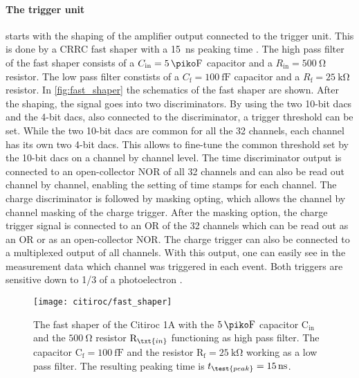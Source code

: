 \paragraph{The trigger unit} starts with the shaping of the amplifier output connected to the trigger unit. 
This is done by a CRRC fast shaper with a \SI{15}{\nano\second} peaking time \cite{citiroc}. 
The high pass filter of the fast shaper consists of a $C_\text{in}=\SI{5}{\piko\farad}$ capacitor and a $R_\text{in}=\SI{500}{\ohm}$ resistor.
The low pass filter constists of a $C_\text{f}=\SI{100}{\femto\farad}$ capacitor and a $R_\text{f}=\SI{25}{\kilo\ohm}$ resistor.
In \autoref{fig:fast_shaper} the schematics of the fast shaper are shown.
After the shaping, the signal goes into two discriminators.
By using the two 10-bit \ac{dac}s and the 4-bit \ac{dac}s, also connected to the discriminator, a trigger threshold can be set.
While the two 10-bit \ac{dac}s are common for all the 32 channels, each channel has its own two 4-bit \ac{dac}s.
This allows to fine-tune the common threshold set by the 10-bit \ac{dac}s on a channel by channel level.
The time discriminator output is connected to an open-collector NOR of all 32 channels and can also be read out channel by channel, enabling the setting of time stamps for each channel.
The charge discriminator is followed by masking opting, which allows the channel by channel masking of the charge trigger. 
After the masking option, the charge trigger signal is connected to an OR of the 32 channels which can be read out as an OR or as an open-collector NOR.
The charge trigger can also be connected to a multiplexed output of all channels.
With this output, one can easily see in the measurement data which channel was triggered in each event.
Both triggers are sensitive down to 1/3 of a photoelectron \cite{citiroc}.

\begin{figure}
	\centering
	\texttt{[image: citiroc/fast\_shaper]}
	\caption[Citiroc 1A fast shaper schematic]{The fast shaper of the Citiroc 1A with the $\SI{5}{\piko\farad}$ capacitor $\text{C}_\text{in}$ and the $\SI{500}{\ohm}$ resistor $\text{R}_\txt{in}$ functioning as high pass filter. The capacitor $\text{C}_\text{f}=\SI{100}{\femto\farad}$ and the resistor $\text{R}_\text{f}=\SI{25}{\kilo\ohm}$ working as a low pass filter. The resulting peaking time is $t_\test{peak}=\SI{15}{\nano\second}$. \cite{citiroc}}
	\label{fig:fast_shaper}
\end{figure}


